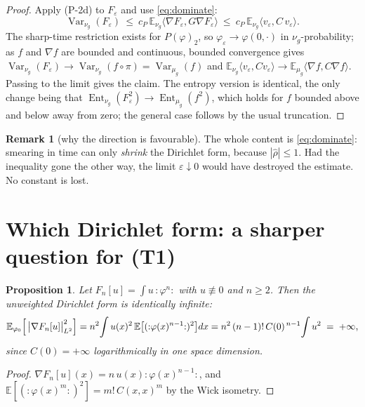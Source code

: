 \documentclass[11pt,a4paper]{article}
\theoremstyle{plain}
\newtheorem{proposition}[theorem]{Proposition}
\theoremstyle{definition}
\newtheorem{remark}[theorem]{Remark}
\newcommand{\E}{\mathbb{E}}
\newcommand{\ip}[2]{\langle #1,#2\rangle}
\DeclareMathOperator{\Var}{Var}
\DeclareMathOperator{\Ent}{Ent}
\begin{document}
\begin{proof}
Apply (P-2d) to $F_\varepsilon$ and use \eqref{eq:dominate}:
\[
  \Var_{\nu_g}(F_\varepsilon)\ \le\ c_P\,\E_{\nu_g}\ip{\nabla F_\varepsilon}{G\nabla F_\varepsilon}
  \ \le\ c_P\,\E_{\nu_g}\ip{v_\varepsilon}{C\,v_\varepsilon} .
\]
The sharp-time restriction exists for $P(\varphi)_2$, so $\varphi_\varepsilon\to\varphi(0,\cdot)$ in
$\nu_g$-probability; as $f$ and $\nabla f$ are bounded and continuous, bounded convergence gives
$\Var_{\nu_g}(F_\varepsilon)\to\Var_{\nu_g}(f\circ\pi)=\Var_{\mu_g}(f)$ and
$\E_{\nu_g}\ip{v_\varepsilon}{Cv_\varepsilon}\to\E_{\mu_g}\ip{\nabla f}{C\nabla f}$. Passing to the
limit gives the claim. The entropy version is identical, the only change being that
$\Ent_{\nu_g}(F_\varepsilon^2)\to\Ent_{\mu_g}(f^2)$, which holds for $f$ bounded above and below
away from zero; the general case follows by the usual truncation.
\end{proof}

\begin{remark}[why the direction is favourable]
The whole content is \eqref{eq:dominate}: smearing in time can only \emph{shrink} the Dirichlet
form, because $|\hat\rho|\le1$. Had the inequality gone the other way, the limit
$\varepsilon\downarrow0$ would have destroyed the estimate. No constant is lost.
\end{remark}

\section{Which Dirichlet form: a sharper question for (T1)}\label{sec:which}

\begin{proposition}\label{prop:L2fails}
Let $F_n[u]=\int u\,{:}\varphi^n{:}$ with $u\not\equiv0$ and $n\ge2$. Then the \emph{unweighted}
Dirichlet form is identically infinite:
\[
  \E_{\varphi_0}\Bigl[\,\bigl|\nabla F_n[u]\bigr|_{L^2}^2\Bigr]
  =n^2\!\int u(x)^2\,\E\bigl[({:}\varphi(x)^{n-1}{:})^2\bigr]dx
  =n^2\,(n-1)!\,C(0)^{\,n-1}\!\int u^2\;=\;+\infty ,
\]
since $C(0)=+\infty$ logarithmically in one space dimension.
\end{proposition}

\begin{proof}
$\nabla F_n[u](x)=n\,u(x){:}\varphi(x)^{n-1}{:}$, and
$\E[({:}\varphi(x)^{m}{:})^2]=m!\,C(x,x)^m$ by the Wick isometry.
\end{proof}
\end{document}
